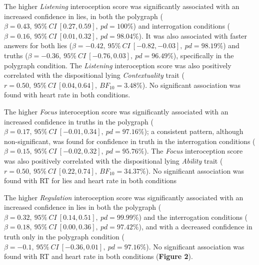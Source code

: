 \documentclass[
  man,mask,floatsintext]{apa6}
\begin{document}
The higher \emph{Listening} interoception score was significantly associated with an increased confidence in lies, in both the polygraph (\(\beta=0.43,~95\%~CI~[0.27, 0.59],~pd = 100\%\)) and interrogation conditions (\(\beta=0.16,~95\%~CI~[0.01, 0.32],~pd = 98.04\%\)). It was also associated with faster answers for both lies (\(\beta=-0.42,~95\%~CI~[-0.82, -0.03],~pd = 98.19\%\)) and truths (\(\beta=-0.36,~95\%~CI~[-0.76, 0.03],~pd = 96.49\%\)), specifically in the polygraph condition. The \emph{Listening} interoception score was also positively correlated with the dispositional lying \emph{Contextuality} trait (\(r = 0.50,~95\%~CI~[0.04, 0.64],~BF_{10} = 3.48\%\)). No significant association was found with heart rate in both conditions.

The higher \emph{Focus} interoception score was significantly associated with an increased confidence in truths in the polygraph (\(\beta=0.17,~95\%~CI~[-0.01, 0.34],~pd = 97.16\%\)); a consistent pattern, although non-significant, was found for confidence in truth in the interrogation conditions (\(\beta=0.15,~95\%~CI~[-0.02, 0.32],~pd = 95.76\%\)). The \emph{Focus} interoception score was also positively correlated with the dispositional lying \emph{Ability} trait (\(r = 0.50,~95\%~CI~[0.22, 0.74],~BF_{10} = 34.37\%\)). No significant association was found with RT for lies and heart rate in both conditions

The higher \emph{Regulation} interoception score was significantly associated with an increased confidence in lies in both the polygraph (\(\beta=0.32,~95\%~CI~[0.14, 0.51],~pd = 99.99\%\)) and the interrogation conditions (\(\beta=0.18,~95\%~CI~[0.00, 0.36],~pd = 97.42\%\)), and with a decreased confidence in truth only in the polygraph condition (\(\beta=-0.1,~95\%~CI~[-0.36, 0.01],~pd = 97.16\%\)). No significant association was found with RT and heart rate in both conditions (\textbf{Figure 2}).
\end{document}

